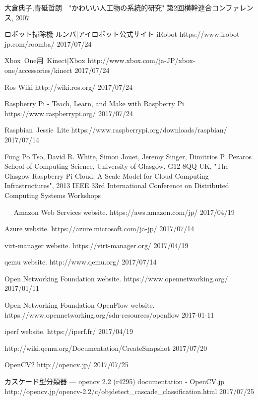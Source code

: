 \documentclass[a4paper, twocolumn]{jarticle}
\begin{document}
\begin{thebibliography}{10}

  大倉典子,青砥哲朗　"かわいい人工物の系統的研究" 第2回横幹連合コンファレンス, 2007

    ロボット掃除機 ルンバ|アイロボット公式サイト-iRobot https://www.irobot-jp.com/roomba/ 2017/07/24

  Xbox\ One用\ Kinect|Xbox http://www.xbox.com/ja-JP/xbox-one/accessories/kinect 2017/07/24

  Ros Wiki http://wiki.ros.org/ 2017/07/24

  Raspberry Pi - Teach, Learn, and Make with Raspberry Pi https://www.raspberrypi.org/ 2017/07/24

    Raspbian\ Jessie\ Lite https://www.raspberrypi.org/downloads/raspbian/ 2017/07/14

    Fung Po Tso, David R. White, Simon Jouet, Jeremy Singer, Dimitrios P. Pezaros School of Computing Science, University of Glasgow, G12 8QQ UK, "The Glasgow Raspberry Pi Cloud: A Scale Model for Cloud Computing Infrastructures", 2013 IEEE 33rd International Conference on Distributed Computing Systems Workshops

　  Amazon Web Services website. https://aws.amazon.com/jp/ 2017/04/19

    Azure website. https://azure.microsoft.com/ja-jp/ 2017/07/14

      virt-manager website. https://virt-manager.org/ 2017/04/19

      qemu website. http://www.qemu.org/ 2017/07/14

      Open Networking Foundation website. https://www.opennetworking.org/ 2017/01/11

      Open Networking Foundation OpenFlow website. https://www.opennetworking.org/sdn-resources/openflow 2017-01-11

        iperf website.  https://iperf.fr/ 2017/04/19

   http://wiki.qemu.org/Documentation/CreateSnapshot 2017/07/20

  OpenCV2 http://opencv.jp/ 2017/07/25

  カスケード型分類器 — opencv 2.2 (r4295) documentation - OpenCV.jp http://opencv.jp/opencv-2.2/c/objdetect\_cascade\_classification.html  2017/07/25

\end{thebibliography}
\end{document}
